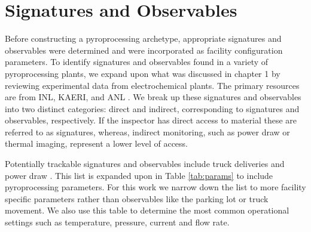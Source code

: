 \FloatBarrier

\section{Signatures and Observables}

Before constructing a pyroprocessing archetype, appropriate signatures and observables were determined and were incorporated as facility configuration parameters. To identify signatures and observables 
found in a variety of pyroprocessing plants, we expand upon what was discussed in chapter 1 by reviewing experimental data from electrochemical plants. The primary resources are from 
INL, KAERI, and ANL \cite{lee_korean_2011,flowsheet_1998,michael_f._simpson_developments_2012,li_electrorefining_2005}. We break up these signatures and observables into two distinct categories: direct and indirect, corresponding to signatures and observables, respectively. If the inspector has direct access to material these are referred to as signatures, whereas, indirect monitoring, such as
power draw or thermal imaging, represent a lower level of access. 

Potentially trackable signatures and observables include truck deliveries and  power draw  \cite{Hou_2016,Yilmaz_2016}. This list is expanded upon in Table \ref{tab:params} to include pyroprocessing parameters. For this work we narrow down the list to more facility specific parameters rather than observables like the parking lot or truck movement. We also use this table
to determine the most common operational settings such as temperature, pressure, current and flow rate.

